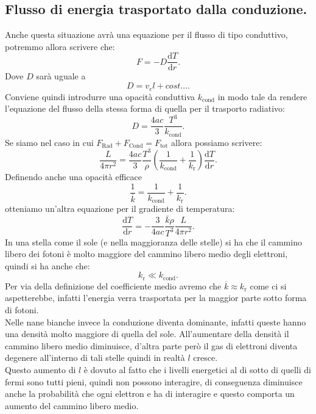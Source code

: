 \subsection{Flusso di energia trasportato dalla conduzione.}
\label{subsec:Flusso di energia trasportato dalla conduzione.}
Anche questa situazione avrà una equazione per il flusso di tipo conduttivo, potremmo allora scrivere che:
\[
	F = - D \frac{\mbox{d} T}{\mbox{d} r} 
.\] 
Dove $D$ sarà uguale a 
 \[
	D = v_e l + cost\ldots
.\] 
Conviene quindi introdurre una opacità conduttiva $k_\text{cond} $ in modo tale da rendere l'equazione del flusso della stessa forma di quella per il trasporto radiativo:
\[
	D = \frac{4ac}{3} \frac{T^3}{k_{\text{cond}}}
.\] 
Se siamo nel caso in cui $F_\text{Rad} + F_\text{Cond} = F_\text{tot}$ allora possiamo scrivere:
\[
	\frac{L}{4\pi r^2} = \frac{4ac}{3}\frac{T^3}{\rho }\left( \frac{1}{k_{\text{cond}} }+ \frac{1}{k_\text{r}} \right)\frac{\mbox{d} T}{\mbox{d} r} 
.\] 
Definendo anche una opacità efficace
\[
	\frac{1}{\overline{k}} =  \frac{1}{k_{\text{cond}} }+ \frac{1}{k_\text{r}}
.\] 
otteniamo un'altra equazione per il gradiente di temperatura:
\[
	\frac{\mbox{d} T}{\mbox{d} r} 
	=
	-\frac{3}{4ac} 
	\frac{\overline{k}\rho }{T^3} \frac{L}{4 \pi r^2}
.\] 
In una stella come il sole (e nella maggioranza delle stelle) si ha che il cammino libero dei fotoni è molto maggiore del cammino libero medio degli elettroni, quindi  si ha anche che:
\[
	k_\text{r} \ll k_\text{cond} 
.\] 
Per via della definizione del coefficiente medio avremo che $\overline{k} \approx k_\text{r} $ come ci si aspetterebbe, infatti l'energia verra trasportata per la maggior parte sotto forma di fotoni.\\
Nelle nane bianche invece la conduzione diventa dominante, infatti queste hanno una densità molto maggiore di quella del sole.
All'aumentare della densità il cammino libero medio diminuisce, d'altra parte però il gas di elettroni diventa degenere all'interno di tali stelle quindi in realtà $l$ cresce. \\
Questo aumento di $l$ è dovuto al fatto che i livelli energetici al di sotto di quelli di fermi sono tutti pieni, quindi non possono interagire, di conseguenza diminuisce anche la probabilità che ogni elettron e ha di interagire e questo comporta un aumento del cammino libero medio.
